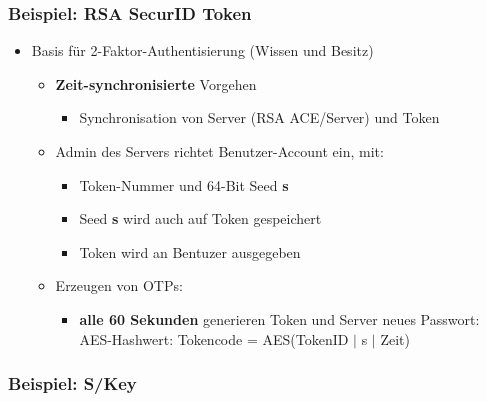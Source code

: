 \documentclass[openany]{book}
\begin{document}
\subsubsection{Beispiel: RSA SecurID Token}

\begin{itemize}
    \item Basis für 2-Faktor-Authentisierung (Wissen und Besitz)
    \begin{itemize}
        \item \textbf{Zeit-synchronisierte} Vorgehen
        \begin{itemize}
            \item Synchronisation von Server (RSA ACE/Server) und Token
        \end{itemize}
        \item Admin des Servers richtet Benutzer-Account ein, mit:
        \begin{itemize}
            \item Token-Nummer und 64-Bit Seed \textbf{s}
            \item Seed \textbf{s} wird auch auf Token gespeichert
            \item Token wird an Bentuzer ausgegeben
        \end{itemize}
        \item Erzeugen von OTPs:
        \begin{itemize}
            \item \textbf{alle 60 Sekunden} generieren Token und Server neues Passwort: AES-Hashwert: Tokencode = AES(TokenID $|$ s $|$ Zeit)
        \end{itemize}
    \end{itemize}
\end{itemize}

\subsubsection{Beispiel: S/Key}
\end{document}
